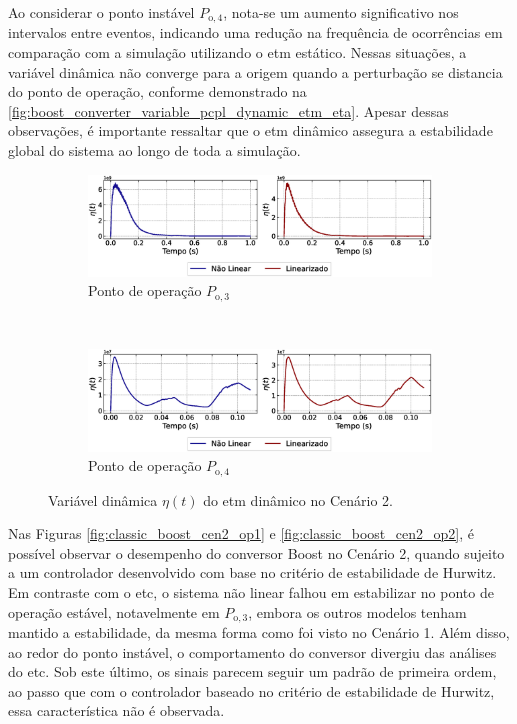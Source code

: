 Ao considerar o ponto instável $P_{\mathrm{o}, 4}$, nota-se um aumento significativo nos intervalos entre eventos, indicando uma redução na frequência de ocorrências em comparação com a simulação utilizando o \acrshort{etm} estático. Nessas situações, a variável dinâmica não converge para a origem quando a perturbação se distancia do ponto de operação, conforme demonstrado na \autoref{fig:boost_converter_variable_pcpl_dynamic_etm_eta}. Apesar dessas observações, é importante ressaltar que o \acrshort{etm} dinâmico assegura a estabilidade global do sistema ao longo de toda a simulação.

\begin{figure}[H]
  \centering
  \captionsetup{justification=centering}
  \begin{subfigure}{1.\textwidth}
    \centering
    \includegraphics[width=1.\textwidth]{figuras/dynamic-etm/boost/sim2/op1/eta.eps}
    \caption{Ponto de operação $P_{\mathrm{o}, 3}$}
  \end{subfigure}
  \\[6pt]
  \begin{subfigure}{1.\textwidth}
    \centering
    \includegraphics[width=1.\textwidth]{figuras/dynamic-etm/boost/sim2/op2/eta.eps}
    \caption{Ponto de operação $P_{\mathrm{o}, 4}$}
  \end{subfigure}
  \caption{Variável dinâmica $\eta(t)$ do \acrshort{etm} dinâmico no Cenário 2.}
  \label{fig:boost_converter_variable_pcpl_dynamic_etm_eta}
\end{figure}

Nas Figuras \ref{fig:classic_boost_cen2_op1} e \ref{fig:classic_boost_cen2_op2}, é possível observar o desempenho do conversor Boost no Cenário 2, quando sujeito a um controlador desenvolvido com base no critério de estabilidade de Hurwitz. Em contraste com o \acrshort{etc}, o sistema não linear falhou em estabilizar no ponto de operação estável, notavelmente em $P_{\mathrm{o}, 3}$, embora os outros modelos tenham mantido a estabilidade, da mesma forma como foi visto no Cenário 1. Além disso, ao redor do ponto instável, o comportamento do conversor divergiu das análises do \acrshort{etc}. Sob este último, os sinais parecem seguir um padrão de primeira ordem, ao passo que com o controlador baseado no critério de estabilidade de Hurwitz, essa característica não é observada.


